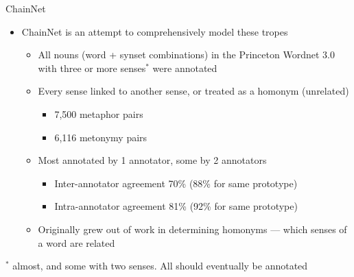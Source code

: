 \documentclass[xetex]{beamer}
\begin{document}
\begin{frame}{ChainNet}

  \begin{itemize}
  \item ChainNet is an attempt to comprehensively model these tropes \citep{maudslay-etal-2024-chainnet-structured,Bond:Maudslay:2025}
    \begin{itemize}
    \item All nouns (word + synset combinations) in the
      Princeton Wordnet 3.0 \citep{_Fellbaum:1998} with three or more senses$^*$
      were annotated
    \item Every sense linked to another sense, or treated as a homonym (unrelated)
      \begin{itemize}
      \item 7,500 metaphor pairs
      \item 6,116 metonymy pairs
      \end{itemize}
  \item Most annotated by 1 annotator, some by 2 annotators
    \begin{itemize}
    \item Inter-annotator agreement 70\% (88\% for same prototype)
    \item Intra-annotator agreement 81\% (92\% for same prototype)
    \end{itemize}
  \item Originally grew out of work in determining homonyms --- which senses of a word are related
  \end{itemize}

\end{itemize}

\begin{small}
 $^*$ almost, and some with two senses.   All should eventually be annotated \\
\end{small}
\end{frame}
\end{document}
